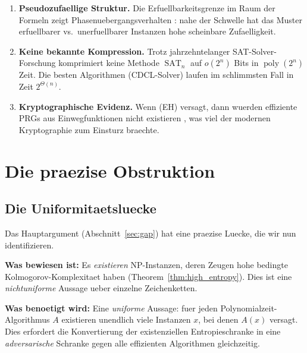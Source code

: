 \documentclass[aps,prd,twocolumn,superscriptaddress,nofootinbib]{revtex4-2}
\theoremstyle{definition}
\theoremstyle{remark}
\DeclareMathOperator{\poly}{poly}
\DeclareMathOperator{\SAT}{SAT}
\begin{document}
\begin{enumerate}
\item \textbf{Pseudozufaellige Struktur.} Die Erfuellbarkeitsgrenze im Raum der Formeln zeigt Phasenuebergangsverhalten \cite{Monasson1999}: nahe der Schwelle hat das Muster erfuellbarer vs.\ unerfuellbarer Instanzen hohe scheinbare Zufaelligkeit.

\item \textbf{Keine bekannte Kompression.} Trotz jahrzehntelanger SAT-Solver-Forschung komprimiert keine Methode $\SAT_n$ auf $o(2^n)$ Bits in $\poly(2^n)$ Zeit. Die besten Algorithmen (CDCL-Solver) laufen im schlimmsten Fall in Zeit $2^{\Theta(n)}$.

\item \textbf{Kryptographische Evidenz.} Wenn (EH) versagt, dann wuerden effiziente PRGs aus Einwegfunktionen nicht existieren \cite{ImpagliazzoWigderson1997}, was viel der modernen Kryptographie zum Einsturz braechte.
\end{enumerate}


\section{Die praezise Obstruktion}
\label{sec:obstruction}

\subsection{Die Uniformitaetsluecke}

Das Hauptargument (Abschnitt~\ref{sec:gap}) hat eine praezise Luecke, die wir nun identifizieren.

\textbf{Was bewiesen ist:} Es \textit{existieren} NP-Instanzen, deren Zeugen hohe bedingte Kolmogorov-Komplexitaet haben (Theorem~\ref{thm:high_entropy}). Dies ist eine \textit{nichtuniforme} Aussage ueber einzelne Zeichenketten.

\textbf{Was benoetigt wird:} Eine \textit{uniforme} Aussage: fuer jeden Polynomialzeit-Algorithmus $A$ existieren unendlich viele Instanzen $x$, bei denen $A(x)$ versagt. Dies erfordert die Konvertierung der existenziellen Entropieschranke in eine \textit{adversarische} Schranke gegen alle effizienten Algorithmen gleichzeitig.
\end{document}
